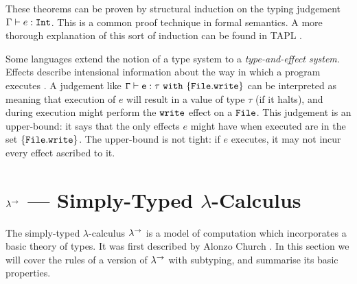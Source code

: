 These theorems can be proven by structural induction on the typing judgement $\Gamma \vdash e: \mathtt{Int}$. This is a common proof technique in formal semantics. A more thorough explanation of this sort of induction can be found in TAPL \cite[p. 31]{tapl}.

Some languages extend the notion of a type system to a \textit{type-and-effect system}. Effects describe intensional information about the way in which a program executes \cite{nielson99}. A judgement like $\mathtt{\Gamma \vdash e: \tau~\mathtt{with}~ \{ File.write \}}$ can be interpreted as meaning that execution of $e$ will result in a value of type $\tau$ (if it halts), and during execution might perform the $\mathtt{write}$ effect on a $\mathtt{File}$. This judgement is an upper-bound: it says that the only effects $e$ might have when executed are in the set $\{ \mathtt{File.write} \}$. The upper-bound is not tight: if $e$ executes, it may not incur every effect ascribed to it.

\section{ $\lambda^{\rightarrow}$ --- Simply-Typed $\lambda$-Calculus}



The simply-typed $\lambda$-calculus $\lambda^{\rightarrow}$ is a model of computation which incorporates a basic theory of types. It was first described by Alonzo Church \cite{church40}. In this section we will cover the rules of a version of $\lambda^{\rightarrow}$ with subtyping, and summarise its basic properties.


